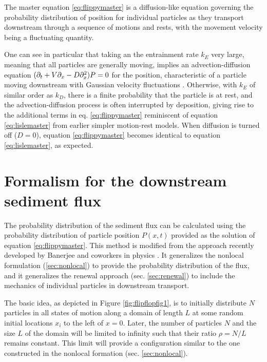The master equation \ref{eq:flippymaster} is a diffusion-like equation governing the probability distribution of position for individual particles as they transport downstream through a sequence of motions and rests, with the movement velocity being a fluctuating quantity.

One can see in particular that taking an the entrainment rate $k_E$ very large, meaning that all particles are generally moving, implies an advection-diffusion equation $(\partial_t + V\partial_x -D \partial_x^2)P=0$ for the position, characteristic of a particle moving downstream with Gaussian velocity fluctuations \citep{Ancey2014}. Otherwise, with $k_E$ of similar order as $k_D$, there is a finite probability that the particle is at rest, and the advection-diffusion process is often interrupted by deposition, giving rise to the additional terms in eq. \ref{eq:flippymaster} reminiscent of equation \ref{eq:lislemaster} from earlier simpler motion-rest models. When diffusion is turned off ($D=0$), equation \ref{eq:flippymaster} becomes identical to equation \ref{eq:lislemaster}, as expected.

\section{Formalism for the downstream sediment flux}
\label{sec:flippyflux}

The probability distribution of the sediment flux can be calculated using the probability distribution of particle position $P(x,t)$ provided as the solution of equation \ref{eq:flippymaster}.
This method is modified from the approach recently developed by Banerjee and coworkers in physics \citep{Banerjee2020}. It generalizes the nonlocal formulation (\ref{sec:nonlocal}) to provide the probability distribution of the flux, and it generalizes the renewal approach (sec. \ref{sec:renewal}) to include the mechanics of individual particles in downstream transport.

The basic idea, as depicted in Figure \ref{fig:flipflopfig1}, is to initially distribute $N$ particles in all states of motion along a domain of length $L$ at some random initial locations $x_i$ to the left of $x=0$.
Later, the number of particles $N$ and the size $L$ of the domain will be limited to infinity such that their ratio $\rho=N/L$ remains constant. 
This limit will provide a configuration similar to the one constructed in the nonlocal formation (sec. \ref{sec:nonlocal}).


